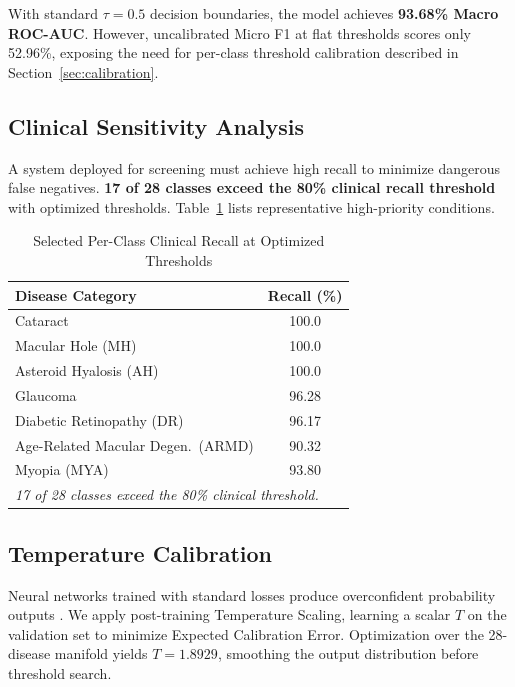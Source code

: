 \documentclass[conference]{IEEEtran}
\begin{document}
With standard $\tau{=}0.5$ decision boundaries, the model achieves \textbf{93.68\% Macro ROC-AUC}. However, uncalibrated Micro F1 at flat thresholds scores only 52.96\%, exposing the need for per-class threshold calibration described in Section~\ref{sec:calibration}.

\subsection{Clinical Sensitivity Analysis}
\label{sec:recalls}
A system deployed for screening must achieve high recall to minimize dangerous false negatives. \textbf{17 of 28 classes exceed the 80\% clinical recall threshold} with optimized thresholds. Table~\ref{tab:recalls} lists representative high-priority conditions.

\begin{table}[ht]
\centering
\caption{Selected Per-Class Clinical Recall at Optimized Thresholds}
\label{tab:recalls}
\begin{tabular}{lc}
\toprule
\textbf{Disease Category} & \textbf{Recall (\%)} \\
\midrule
Cataract                        & 100.0 \\
Macular Hole (MH)               & 100.0 \\
Asteroid Hyalosis (AH)          & 100.0 \\
Glaucoma                        & 96.28 \\
Diabetic Retinopathy (DR)       & 96.17 \\
Age-Related Macular Degen.\ (ARMD) & 90.32 \\
Myopia (MYA)                    & 93.80 \\
\midrule
\multicolumn{2}{l}{\textit{17 of 28 classes exceed the 80\% clinical threshold.}} \\
\bottomrule
\end{tabular}
\end{table}

\subsection{Temperature Calibration}
\label{sec:calibration_results}
Neural networks trained with standard losses produce overconfident probability outputs \cite{guo2017calibration}. We apply post-training Temperature Scaling, learning a scalar $T$ on the validation set to minimize Expected Calibration Error. Optimization over the 28-disease manifold yields $T = 1.8929$, smoothing the output distribution before threshold search.
\end{document}
